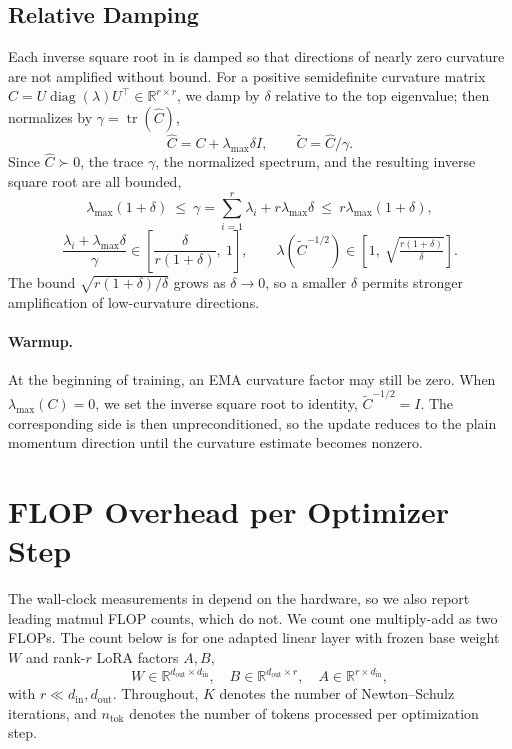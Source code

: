 \documentclass[11pt]{article}
\DeclareMathOperator{\Tr}{tr}
\theoremstyle{plain}
\theoremstyle{definition}
\theoremstyle{remark}
\theoremstyle{definition}
\begin{document}
\subsection{Relative Damping}\label{app:damping}
Each inverse square root in  is damped so that directions of
nearly zero curvature are not amplified without bound.  For a positive
semidefinite curvature matrix $C = U\operatorname{diag}(\lambda)U^\top \in \mathbb{R}^{r\times r}$,
we damp by $\delta$ relative to the top eigenvalue;  then
normalizes by $\gamma=\Tr(\widehat{C})$,
\[
    \widehat{C} = C + \lambda_{\max}\delta I,
    \qquad
    \widetilde C = \widehat{C}/\gamma .
\]
Since $\widehat{C} \succ 0$, the trace $\gamma$, the normalized spectrum, and the resulting
inverse square root are all bounded,
\[
    \lambda_{\max}(1+\delta) \ \le\ \gamma
        = \textstyle\sum_{i=1}^r \lambda_i + r\lambda_{\max}\delta
        \ \le\ r\lambda_{\max}(1+\delta),
\]
\[
    \frac{\lambda_i + \lambda_{\max}\delta}{\gamma}
        \in \left[\frac{\delta}{r(1+\delta)},\ 1\right],
        \qquad
    \lambda\!\left(\widetilde C^{-1/2}\right)
        \in \left[1,\ \sqrt{\tfrac{r(1+\delta)}{\delta}}\right].
\]
The bound $\sqrt{r(1+\delta)/\delta}$ grows as $\delta\to 0$, so a smaller
$\delta$ permits stronger amplification of low-curvature directions.

\paragraph{Warmup.}
At the beginning of training, an EMA curvature factor may still be zero.
When $\lambda_{\max}(C)=0$, we set the inverse square root
to identity,
$\widetilde C^{-1/2}=I$.  The corresponding
side is then unpreconditioned, so the update reduces to the plain
momentum direction until the curvature estimate becomes nonzero.





\section{FLOP Overhead per Optimizer Step}
\label{app:flops}
The wall-clock measurements in  depend on the hardware, so
we also report leading matmul FLOP counts, which do not.  We count one
multiply-add as two FLOPs.  The count below is for one
adapted linear layer with frozen base weight $W$ and rank-$r$ LoRA factors
$A,B$,
\[
  W\in\mathbb{R}^{d_{\mathrm{out}}\times d_{\mathrm{in}}},\quad
  B\in\mathbb{R}^{d_{\mathrm{out}}\times r},\quad
  A\in\mathbb{R}^{r\times d_{\mathrm{in}}},
\]
with $r\ll d_{\mathrm{in}},d_{\mathrm{out}}$.  Throughout, $K$ denotes the number
of Newton--Schulz iterations, and $n_{\mathrm{tok}}$ denotes the number of tokens
processed per optimization step.
\end{document}
